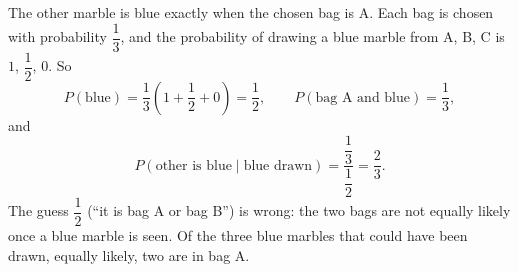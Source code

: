The other marble is blue exactly when the chosen bag is A. Each bag is chosen with probability $\dfrac{1}{3}$, and the probability of drawing a blue marble from A, B, C is $1$, $\dfrac{1}{2}$, $0$. So
\[
P(\text{blue})=\dfrac{1}{3}\left(1+\dfrac{1}{2}+0\right)=\dfrac{1}{2},\qquad P(\text{bag A and blue})=\dfrac{1}{3},
\]
and
\[
P(\text{other is blue}\mid\text{blue drawn})=\dfrac{\dfrac{1}{3}}{\dfrac{1}{2}}=\boxed{\dfrac{2}{3}}.
\]
The guess $\dfrac{1}{2}$ (``it is bag A or bag B'') is wrong: the two bags are not equally likely once a blue marble is seen. Of the three blue marbles that could have been drawn, equally likely, two are in bag A.
